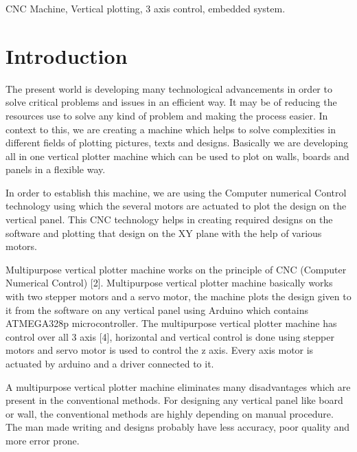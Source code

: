 \documentclass[conference]{IEEEtran}
\begin{document}
\vspace*{12pt}

\begin{IEEEkeywords}
    CNC Machine, Vertical plotting, 3 axis
    control, embedded system.
\end{IEEEkeywords}


\section{Introduction}
The present world is developing many technological
advancements in order to solve critical problems and issues in
an efficient way. It may be of reducing the resources use to
solve any kind of problem and making the process easier.
In context to this, we are creating a machine which helps to
solve complexities in different fields of plotting pictures, texts
and designs. Basically we are developing all in one vertical
plotter machine which can be used to plot on walls, boards and
panels in a flexible way.

\vspace*{12pt}

In order to establish this machine, we are using the Computer
numerical Control technology using which the several motors
are actuated to plot the design on the vertical panel. This CNC
technology helps in creating required designs on the software
and plotting that design on the XY plane with the help of
various motors.

\vspace{12pt}
Multipurpose vertical plotter machine works on the principle of
CNC (Computer Numerical Control) [2]. Multipurpose vertical
plotter machine basically works with two stepper motors and a
servo motor, the machine plots the design given to it from the
software on any vertical panel using Arduino which contains
ATMEGA328p microcontroller. The multipurpose vertical
plotter machine has control over all 3 axis [4], horizontal and
vertical control is done using stepper motors and servo motor is
used to control the z axis. Every axis motor is actuated by
arduino and a driver connected to it.

\vspace{12pt}

\vskip 55pt


A multipurpose vertical plotter machine eliminates many
disadvantages which are present in the conventional methods.
For designing any vertical panel like board or wall, the
conventional methods are highly depending on manual
procedure. The man made writing and designs probably have
less accuracy, poor quality and more error prone.
\end{document}
